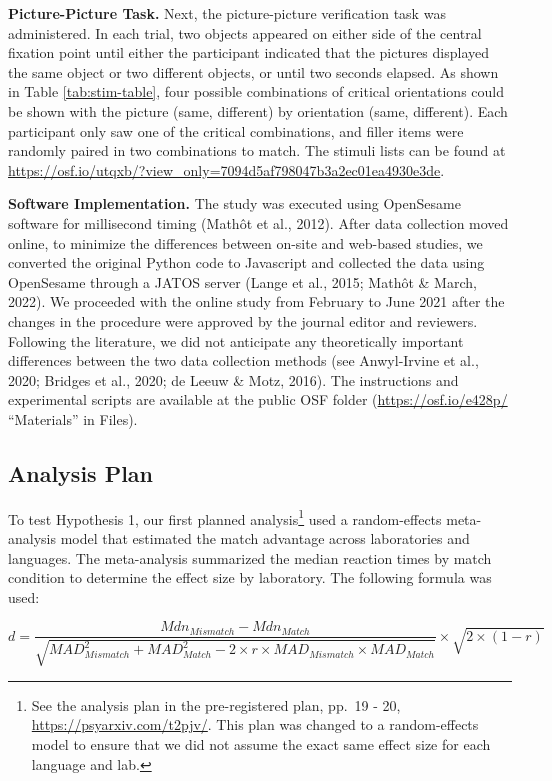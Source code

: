 \documentclass[
  man,floatsintext]{apa7}
\begin{document}
\textbf{Picture-Picture Task.} Next, the picture-picture verification task
was administered. In each trial, two objects appeared on either side of
the central fixation point until either the participant indicated that
the pictures displayed the same object or two different objects, or
until two seconds elapsed. As shown in Table \ref{tab:stim-table}, four
possible combinations of critical orientations could be shown with the
picture (same, different) by orientation (same, different). Each
participant only saw one of the critical combinations, and filler items
were randomly paired in two combinations to match. The stimuli lists can
be found at \url{https://osf.io/utqxb/?view_only=7094d5af798047b3a2ec01ea4930e3de}.

\textbf{Software Implementation.} The study was executed using OpenSesame
software for millisecond timing
(Mathôt et al., 2012). After data collection moved
online, to minimize the differences between on-site and web-based
studies, we converted the original Python code to Javascript and
collected the data using OpenSesame through a JATOS server
(Lange et al., 2015; Mathôt \& March, 2022). We proceeded with
the online study from February to June 2021 after the changes in the
procedure were approved by the journal editor and reviewers. Following
the literature, we did not anticipate any theoretically important
differences between the two data collection methods (see Anwyl-Irvine et al., 2020; Bridges et al., 2020; de Leeuw \& Motz, 2016). The instructions and experimental
scripts are available at the public OSF folder (\url{https://osf.io/e428p/}
``Materials'' in Files).

\hypertarget{analysis-plan}{%
\subsection{Analysis Plan}\label{analysis-plan}}

To test Hypothesis 1, our first planned analysis\footnote{See the analysis plan in the pre-registered plan, pp.~19 - 20,
  \url{https://psyarxiv.com/t2pjv/}. This plan was changed to a
  random-effects model to ensure that we did not assume the exact same
  effect size for each language and lab.} used a
random-effects meta-analysis model that estimated the match advantage
across laboratories and languages. The meta-analysis summarized the
median reaction times by match condition to determine the effect size by
laboratory. The following formula was used:

\[d = \frac{Mdn_{Mismatch} - Mdn_{Match}}{\sqrt{MAD_{Mismatch}^2 + MAD_{Match}^2-2\times r\times MAD_{Mismatch} \times MAD_{Match}}} \times \sqrt{2 \times (1-r)}\]
\end{document}

